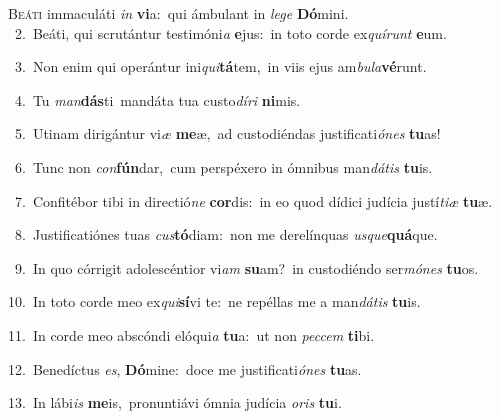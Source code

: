 \lettrine{\initial\textcolor{\initialcolor}{B}}{eáti} immaculáti \textit{in} \textbf{vi}\-a:~\star qui ámbulant in \textit{le}\-\textit{ge} \textbf{Dó}\-mini.\\
{\numbfont\textcolor{\numbcolor}{~2.}}~Beáti, qui scrutántur testimóni\textit{a} \textbf{e}\-jus:~\star in toto corde ex\-\textit{quí}\-\textit{runt} \textbf{e}\-um.\par
{\numbfont\textcolor{\numbcolor}{~3.}}~Non enim qui operántur ini\-\textit{qui}\-\textbf{tá}tem,~\star in viis ejus am\-\textit{bu}\-\textit{la}\textbf{vé}runt.\par
{\numbfont\textcolor{\numbcolor}{~4.}}~Tu \textit{man}\-\textbf{dás}ti~\star mandáta tua custo\-\textit{dí}\-\textit{ri} \textbf{ni}\-mis.\par
{\numbfont\textcolor{\numbcolor}{~5.}}~Utinam dirigántur vi\textit{æ} \textbf{me}\-æ,~\star ad custodiéndas justificati\-\textit{ó}\-\textit{nes} \textbf{tu}\-as!\par
{\numbfont\textcolor{\numbcolor}{~6.}}~Tunc non \textit{con}\-\textbf{fún}dar,~\star cum perspéxero in ómnibus man\-\textit{dá}\-\textit{tis} \textbf{tu}\-is.\par
{\numbfont\textcolor{\numbcolor}{~7.}}~Confitébor tibi in directió\textit{ne} \textbf{cor}\-dis:~\star in eo quod dídici judícia justí\-\textit{ti}\-\textit{æ} \textbf{tu}\-æ.\par
{\numbfont\textcolor{\numbcolor}{~8.}}~Justificatiónes tuas \textit{cus}\-\textbf{tó}diam:~\star non me derelínquas \textit{us}\-\textit{que}\textbf{quá}que.\par
{\numbfont\textcolor{\numbcolor}{~9.}}~In quo córrigit adolescéntior vi\textit{am} \textbf{su}\-am?~\star in custodiéndo ser\-\textit{mó}\-\textit{nes} \textbf{tu}\-os.\par
{\numbfont\textcolor{\numbcolor}{10.}}~In toto corde meo ex\-\textit{qui}\-\textbf{sí}vi te:~\star ne repéllas me a man\-\textit{dá}\-\textit{tis} \textbf{tu}\-is.\par
{\numbfont\textcolor{\numbcolor}{11.}}~In corde meo abscóndi elóqui\textit{a} \textbf{tu}\-a:~\star ut non \textit{pec}\-\textit{cem} \textbf{ti}\-bi.\par
{\numbfont\textcolor{\numbcolor}{12.}}~Benedíctus \textit{es}\-, \textbf{Dó}\-mine:~\star doce me justificati\-\textit{ó}\-\textit{nes} \textbf{tu}\-as.\par
{\numbfont\textcolor{\numbcolor}{13.}}~In lábi\textit{is} \textbf{me}\-is,~\star pronuntiávi ómnia judícia \textit{o}\-\textit{ris} \textbf{tu}\-i.\par
